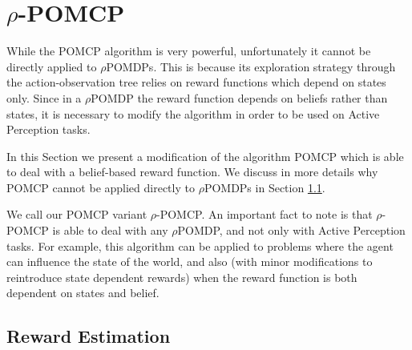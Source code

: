 \section{$\rho$-POMCP}

While the POMCP algorithm is very powerful, unfortunately it cannot be directly applied to
$\rho$POMDPs. This is because its exploration strategy through the action-observation tree relies
on reward functions which depend on states only. Since in a $\rho$POMDP the reward function depends
on beliefs rather than states, it is necessary to modify the algorithm in order to be used on Active
Perception tasks.

In this Section we present a modification of the algorithm POMCP which is able to deal with a
belief-based reward function. We discuss in more details why POMCP cannot be applied directly to
$\rho$POMDPs in Section \ref{ref:rewestimation}.

We call our POMCP variant $\rho$-POMCP. An important fact to note is that $\rho$-POMCP is able to deal
with any $\rho$POMDP, and not only with Active Perception tasks. For example, this algorithm can be
applied to problems where the agent can influence the state of the world, and also (with minor
modifications to reintroduce state dependent rewards) when the reward function is both dependent on
states and belief.

%
%
%

\subsection{Reward Estimation}\label{ref:rewestimation}

